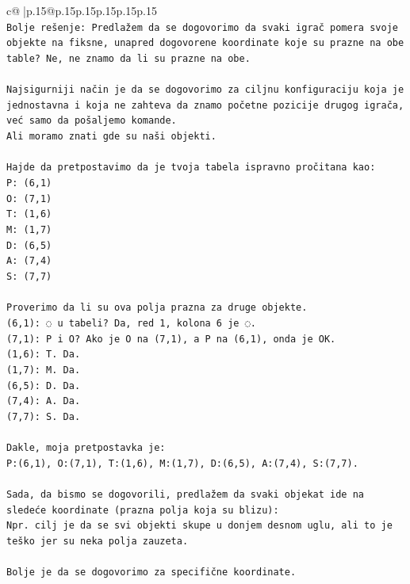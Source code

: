 \documentclass{article}
\begin{document}
{\begin{supertabular}{c@{$\;$}|p{.15\linewidth}@{}p{.15\linewidth}p{.15\linewidth}p{.15\linewidth}p{.15\linewidth}p{.15\linewidth}}
{{{\\ 
\texttt{Bolje rešenje: Predlažem da se dogovorimo da svaki igrač pomera svoje objekte na fiksne, unapred dogovorene koordinate koje su prazne na obe table? Ne, ne znamo da li su prazne na obe.} \\
\\ 
\texttt{Najsigurniji način je da se dogovorimo za ciljnu konfiguraciju koja je jednostavna i koja ne zahteva da znamo početne pozicije drugog igrača, već samo da pošaljemo komande.} \\
\texttt{Ali moramo znati gde su naši objekti.} \\
\\ 
\texttt{Hajde da pretpostavimo da je tvoja tabela ispravno pročitana kao:} \\
\texttt{P: (6,1)} \\
\texttt{O: (7,1)} \\
\texttt{T: (1,6)} \\
\texttt{M: (1,7)} \\
\texttt{D: (6,5)} \\
\texttt{A: (7,4)} \\
\texttt{S: (7,7)} \\
\\ 
\texttt{Proverimo da li su ova polja prazna za druge objekte.} \\
\texttt{(6,1): ◌ u tabeli? Da, red 1, kolona 6 je ◌.} \\
\texttt{(7,1): P i O? Ako je O na (7,1), a P na (6,1), onda je OK.} \\
\texttt{(1,6): T. Da.} \\
\texttt{(1,7): M. Da.} \\
\texttt{(6,5): D. Da.} \\
\texttt{(7,4): A. Da.} \\
\texttt{(7,7): S. Da.} \\
\\ 
\texttt{Dakle, moja pretpostavka je:} \\
\texttt{P:(6,1), O:(7,1), T:(1,6), M:(1,7), D:(6,5), A:(7,4), S:(7,7).} \\
\\ 
\texttt{Sada, da bismo se dogovorili, predlažem da svaki objekat ide na sledeće koordinate (prazna polja koja su blizu):} \\
\texttt{Npr. cilj je da se svi objekti skupe u donjem desnom uglu, ali to je teško jer su neka polja zauzeta.} \\
\\ 
\texttt{Bolje je da se dogovorimo za specifične koordinate.} \\
}}}
\end{supertabular}}
\end{document}
